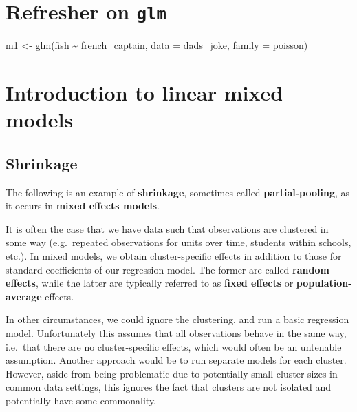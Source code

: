 \documentclass[
  12pt,
]{book}
\newenvironment{Shaded}{\begin{snugshade}}{\end{snugshade}}
\newcommand{\AttributeTok}[1]{\textcolor[rgb]{0.77,0.63,0.00}{#1}}
\newcommand{\FunctionTok}[1]{\textcolor[rgb]{0.00,0.00,0.00}{#1}}
\newcommand{\NormalTok}[1]{#1}
\newcommand{\OtherTok}[1]{\textcolor[rgb]{0.56,0.35,0.01}{#1}}
\newcommand{\SpecialCharTok}[1]{\textcolor[rgb]{0.00,0.00,0.00}{#1}}
\begin{document}
\hypertarget{refresher-on-glm}{%
\chapter{\texorpdfstring{Refresher on \texttt{glm}}{Refresher on glm}}\label{refresher-on-glm}}

\begin{Shaded}
\begin{Highlighting}[]
\NormalTok{m1 }\OtherTok{\textless{}{-}} \FunctionTok{glm}\NormalTok{(fish }\SpecialCharTok{\textasciitilde{}}\NormalTok{ french\_captain, }\AttributeTok{data =}\NormalTok{ dads\_joke, }\AttributeTok{family =}\NormalTok{ poisson)}
\end{Highlighting}
\end{Shaded}

\hypertarget{introduction-to-linear-mixed-models}{%
\chapter{Introduction to linear mixed models}\label{introduction-to-linear-mixed-models}}

\hypertarget{shrinkage}{%
\section{Shrinkage}\label{shrinkage}}

The following is an example of \textbf{shrinkage}, sometimes called \textbf{partial-pooling}, as it occurs in \textbf{mixed effects models}.

It is often the case that we have data such that observations are clustered in some way (e.g.~repeated observations for units over time, students within schools, etc.). In mixed models, we obtain cluster-specific effects in addition to those for standard coefficients of our regression model. The former are called \textbf{random effects}, while the latter are typically referred to as \textbf{fixed effects} or \textbf{population-average} effects.

In other circumstances, we could ignore the clustering, and run a basic regression model. Unfortunately this assumes that all observations behave in the same way, i.e.~that there are no cluster-specific effects, which would often be an untenable assumption. Another approach would be to run separate models for each cluster. However, aside from being problematic due to potentially small cluster sizes in common data settings, this ignores the fact that clusters are not isolated and potentially have some commonality.
\end{document}
